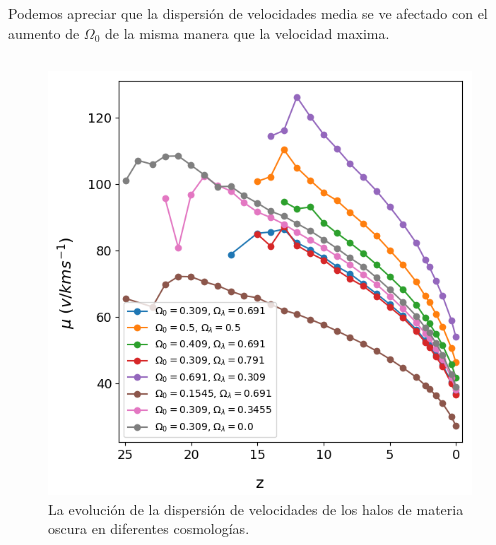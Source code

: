 \documentclass{beamer}
\begin{document}
	\begin{frame}
		\small Podemos apreciar que la dispersión de velocidades media se ve afectado con el aumento de $\Omega_0$ de la misma manera que la velocidad maxima.
		
		\begin{columns}[t]
			\begin{column}{.5\textwidth}
				\begin{figure}
					\centering
					\includegraphics[scale=0.27]{Conc/VelDisp_Mean_Conc.png}
					\caption{\footnotesize La evolución de la dispersión de velocidades de los halos de materia oscura en diferentes cosmologías.}
					\label{fig:Conc-VelDispMean}
				\end{figure}
			\end{column}


\end{columns}
\end{frame}
\end{document}
